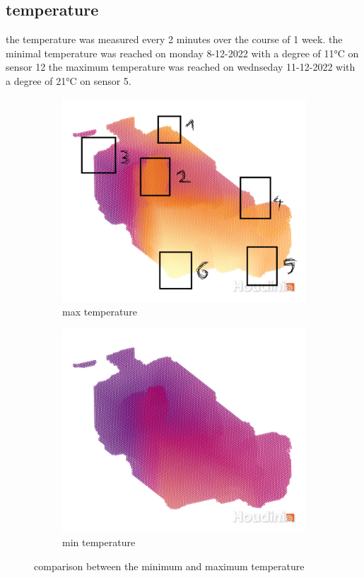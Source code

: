 \subsection{temperature} 
the temperature was measured every 2 minutes over the course of 1 week. the minimal temperature was reached on monday 8-12-2022 with a degree of 11°C on sensor 12 the maximum temperature was reached on wednseday 11-12-2022 with a degree of 21°C on sensor 5.\\ 
\begin{figure}[hbt!] 
\begin{subfigure}{0.5\textwidth} 
\includegraphics[width=0.99\linewidth]{reports/current_report/images/max_temperature.png}  
\caption{max temperature}  
\end{subfigure} 
\begin{subfigure}{0.5\textwidth} 
\includegraphics[width=0.99\linewidth]{reports/current_report/images/min_temperature.png}  
\caption{min temperature}  
\end{subfigure} 
\caption{comparison between the minimum and maximum  temperature}  
\end{figure} 
